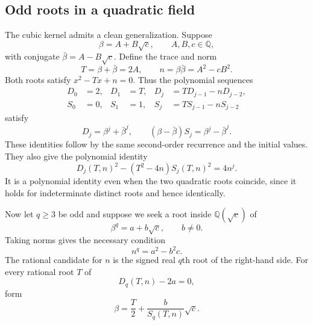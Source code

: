 \documentclass[11pt,a4paper]{article}
\newcommand{\Q}{\mathbb Q}\newcommand{\C}{\mathbb C}
\theoremstyle{definition}\newtheorem{definition}[proposition]{Definition}
\theoremstyle{remark}\newtheorem{remark}[proposition]{Remark}
\begin{document}
\subsection{Odd roots in a quadratic field}
The cubic kernel admits a clean generalization. Suppose
\begin{equation}
 \beta=A+B\sqrt c,\qquad A,B,c\in\Q,
\end{equation}
with conjugate $\bar\beta=A-B\sqrt c$. Define the trace and norm
\begin{equation}
 T=\beta+\bar\beta=2A,\qquad n=\beta\bar\beta=A^2-cB^2.
\end{equation}
Both roots satisfy $x^2-Tx+n=0$. Thus the polynomial sequences
\begin{align}
 D_0&=2,&D_1&=T,&D_j&=T D_{j-1}-nD_{j-2},\\
 S_0&=0,&S_1&=1,&S_j&=T S_{j-1}-nS_{j-2}
\end{align}
satisfy
\begin{equation}\label{eq:D-S-meaning}
 D_j=\beta^j+\bar\beta^j,\qquad
 (\beta-\bar\beta)S_j=\beta^j-\bar\beta^j.
\end{equation}
These identities follow by the same second-order recurrence and the initial
values. They also give the polynomial identity
\begin{equation}\label{eq:D-S-identity}
 D_j(T,n)^2-(T^2-4n)S_j(T,n)^2=4n^j.
\end{equation}
It is a polynomial identity even when the two quadratic roots coincide, since
it holds for indeterminate distinct roots and hence identically.

Now let $q\ge3$ be odd and suppose we seek a root inside $\Q(\sqrt c)$ of
\begin{equation}
 \beta^q=a+b\sqrt c,\qquad b\ne0.
\end{equation}
Taking norms gives the necessary condition
\begin{equation}
 n^q=a^2-b^2c.
\end{equation}
The rational candidate for $n$ is the signed real $q$th root of the right-hand
side. For every rational root $T$ of
\begin{equation}\label{eq:trace-polynomial}
 D_q(T,n)-2a=0,
\end{equation}
form
\begin{equation}\label{eq:odd-reconstruction}
 \beta=\frac T2+\frac b{S_q(T,n)}\sqrt c.
\end{equation}
\end{document}
